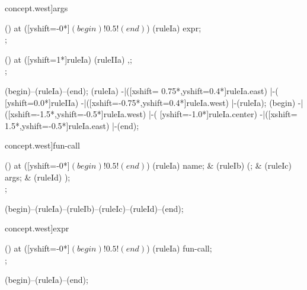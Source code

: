 \begin{syntax}[[xshift=20mm]concept.west]{args}
  
  \node[sequence,column sep=1.5cm] () at ([yshift=-0*\syntaxruledist]$(begin)!0.5!(end)$) {
    \node[nonterminal] (ruleIa) {expr};
    \\
  };
  
  \node[sequence,column sep=1.0cm] () at ([yshift=1*\syntaxruledist]ruleIa) {
    \node[terminal]    (ruleIIa) {,};
    \\
  };
  
  \draw[path] (begin)--(ruleIa)--(end);
  \draw[path] (ruleIa)
            -|([xshift= 0.75*\syntaxruledist,yshift=0.4*\syntaxruledist]ruleIa.east)
            |-(                            [yshift=0.0*\syntaxruledist]ruleIIa)
            -|([xshift=-0.75*\syntaxruledist,yshift=0.4*\syntaxruledist]ruleIa.west)
            |-(ruleIa);
  \draw[path] (begin)
            -|([xshift=-1.5*\syntaxruledist,yshift=-0.5*\syntaxruledist]ruleIa.west)
            |-(                            [yshift=-1.0*\syntaxruledist]ruleIa.center)
            -|([xshift= 1.5*\syntaxruledist,yshift=-0.5*\syntaxruledist]ruleIa.east)
            |-(end);
\end{syntax}

\begin{syntax}[[xshift=20mm]concept.west]{fun-call}
  
  \node[sequence,column sep=1.5cm] () at ([yshift=-0*\syntaxruledist]$(begin)!0.5!(end)$) {
    \node[terminal]    (ruleIa) {name};
    &
    \node[terminal]    (ruleIb) {(};
    &
    \node[nonterminal] (ruleIc) {args};
    &
    \node[terminal]    (ruleId) {)};
    \\
  };
  
  \draw[path] (begin)--(ruleIa)--(ruleIb)--(ruleIc)--(ruleId)--(end);
\end{syntax}

\begin{syntax}[[xshift=20mm]concept.west]{expr}
  
  \node[sequence,column sep=1.5cm] () at ([yshift=-0*\syntaxruledist]$(begin)!0.5!(end)$) {
    \node[nonterminal] (ruleIa) {fun-call};
    \\
  };
  
  \draw[path] (begin)--(ruleIa)--(end);
\end{syntax}

